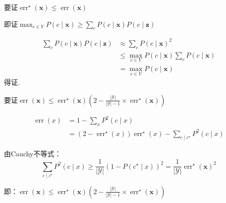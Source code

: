 \documentclass[UTF8,a4paper,AutoFakeBold,AutoFakeSlant]{article}
\begin{document}
要证$\operatorname{err}^{\star}(\boldsymbol{x}) \leq \operatorname{err}(\boldsymbol{x})$

即证$\max _{c \in Y} P(c \mid \boldsymbol{x}) \geq \sum_{c} P(c \mid \boldsymbol{x}) P(c \mid \boldsymbol{z})$

\begin{equation*}
  \begin{aligned}
    \sum_{c} P(c \mid \boldsymbol{x}) P(c \mid \boldsymbol{z}) & \approx \sum_{c} P(c \mid \boldsymbol{x})^2                                    \\
                                                               & \leq \max_{c \in Y}  P(c \mid \boldsymbol{x}) \sum_c  P(c \mid \boldsymbol{x}) \\
                                                               & = \max _{c \in Y} P(c \mid \boldsymbol{x})
  \end{aligned}
\end{equation*}
得证.

要证$\operatorname{err}(\boldsymbol{x}) \leq \operatorname{err}^{\star}(\boldsymbol{x})\left(2-\frac{|\mathcal{Y}|}{|\mathcal{Y}|-1} \times \operatorname{err}^{\star}(\boldsymbol{x})\right)$

\begin{equation*}
  \begin{aligned}
    \operatorname{err}(x) & =1- \sum_x P^{2}(c \mid x)                                                                                        \\
                          & =\left(2-\operatorname{err}^{\star}(x)\right) \operatorname{err}^{\star}(x)-\sum_{c \mid c^\star} P^{2}(c \mid x)
  \end{aligned}
\end{equation*}

由Cauchy不等式：
\begin{equation*}
  \sum_{c \mid c^\star} P^{2}(c \mid x) \geq \frac{1}{|\mathcal{Y}|}(1-P(c^\star \mid x))^2 = \frac{1}{|\mathcal{Y}|}\operatorname{err}^{\star}(\boldsymbol{x})^2
\end{equation*}

即：$\operatorname{err}(\boldsymbol{x}) \leq \operatorname{err}^{\star}(\boldsymbol{x})\left(2-\frac{|\mathcal{Y}|}{|\mathcal{Y}|-1} \times \operatorname{err}^{\star}(\boldsymbol{x})\right)$



\subsection{}
\end{document}
